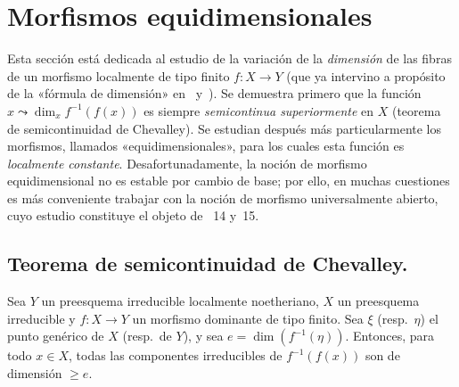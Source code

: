 \section{Morfismos equidimensionales}
\label{section:IV.13}


Esta sección está dedicada al estudio de la variación de la \emph{dimensión} de las fibras de un morfismo localmente de tipo finito $f:X\to Y$ (que ya intervino a propósito de la «fórmula de dimensión» en~ y~).
Se demuestra primero  que la función $x\leadsto\dim_x f^{-1}(f(x))$ es siempre \emph{semicontinua superiormente} en $X$ (teorema de semicontinuidad de Chevalley).
Se estudian después más particularmente los morfismos, llamados «equidimensionales», para los cuales esta función es \emph{localmente constante}.
Desafortunadamente, la noción de morfismo equidimensional no es estable por cambio de base; por ello, en muchas cuestiones es más conveniente trabajar con la noción de morfismo universalmente abierto, cuyo estudio constituye el objeto de \textsection\textsection~14 y~15.

\subsection{Teorema de semicontinuidad de Chevalley.}
\label{subsection:IV.13.1}

\begin{lemma}[13.1.1]
\label{IV.13.1.1}
Sea $Y$ un preesquema irreducible localmente noetheriano, $X$ un preesquema irreducible y $f:X\to Y$ un morfismo dominante de tipo finito.
Sea $\xi$ \textup{(resp.\ $\eta$)} el punto genérico de $X$ \textup{(resp.\ de $Y$)}, y sea $e=\dim(f^{-1}(\eta))$.
Entonces, para todo $x\in X$, todas las componentes irreducibles de $f^{-1}(f(x))$ son de dimensión $\geq e$.
\end{lemma}


